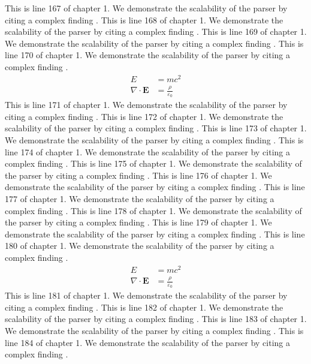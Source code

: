 This is line 167 of chapter 1. We demonstrate the scalability of the parser by citing a complex finding \cite{ref1_167}.
This is line 168 of chapter 1. We demonstrate the scalability of the parser by citing a complex finding \cite{ref1_168}.
This is line 169 of chapter 1. We demonstrate the scalability of the parser by citing a complex finding \cite{ref1_169}.
This is line 170 of chapter 1. We demonstrate the scalability of the parser by citing a complex finding \cite{ref1_170}.
\begin{align*}
  E &= mc^2 \\
  \nabla \cdot \mathbf{E} &= \frac{\rho}{\varepsilon_0}
\end{align*}
This is line 171 of chapter 1. We demonstrate the scalability of the parser by citing a complex finding \cite{ref1_171}.
This is line 172 of chapter 1. We demonstrate the scalability of the parser by citing a complex finding \cite{ref1_172}.
This is line 173 of chapter 1. We demonstrate the scalability of the parser by citing a complex finding \cite{ref1_173}.
This is line 174 of chapter 1. We demonstrate the scalability of the parser by citing a complex finding \cite{ref1_174}.
This is line 175 of chapter 1. We demonstrate the scalability of the parser by citing a complex finding \cite{ref1_175}.
This is line 176 of chapter 1. We demonstrate the scalability of the parser by citing a complex finding \cite{ref1_176}.
This is line 177 of chapter 1. We demonstrate the scalability of the parser by citing a complex finding \cite{ref1_177}.
This is line 178 of chapter 1. We demonstrate the scalability of the parser by citing a complex finding \cite{ref1_178}.
This is line 179 of chapter 1. We demonstrate the scalability of the parser by citing a complex finding \cite{ref1_179}.
This is line 180 of chapter 1. We demonstrate the scalability of the parser by citing a complex finding \cite{ref1_180}.
\begin{align*}
  E &= mc^2 \\
  \nabla \cdot \mathbf{E} &= \frac{\rho}{\varepsilon_0}
\end{align*}
This is line 181 of chapter 1. We demonstrate the scalability of the parser by citing a complex finding \cite{ref1_181}.
This is line 182 of chapter 1. We demonstrate the scalability of the parser by citing a complex finding \cite{ref1_182}.
This is line 183 of chapter 1. We demonstrate the scalability of the parser by citing a complex finding \cite{ref1_183}.
This is line 184 of chapter 1. We demonstrate the scalability of the parser by citing a complex finding \cite{ref1_184}.
